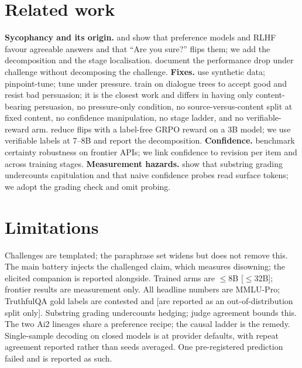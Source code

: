 \documentclass{article}
\newcommand{\pending}[1]{\textcolor{blue!70!black}{[#1]}}
\begin{document}
\section{Related work}
\textbf{Sycophancy and its origin.} \citet{perez2022discovering} and \citet{sharma2023sycophancy} show that preference models and RLHF favour agreeable answers and that ``Are you sure?'' flips them; we add the decomposition and the stage localisation. \citet{laban2023flipflop} document the performance drop under challenge without decomposing the challenge. \textbf{Fixes.} \citet{wei2023simple} use synthetic data; \citet{chen2024pinpoint} pinpoint-tune; \citet{zhang2025pressuretune} tune under pressure. \citet{stengeleskin2025pbt} train on dialogue trees to accept good and resist bad persuasion; it is the closest work and differs in having only content-bearing persuasion, no pressure-only condition, no source-versus-content split at fixed content, no confidence manipulation, no stage ladder, and no verifiable-reward arm. \citet{mytsyk2026bts} reduce flips with a label-free GRPO reward on a 3B model; we use verifiable labels at 7--8B and report the decomposition. \textbf{Confidence.} \citet{saadat2026certainty} benchmark certainty robustness on frontier APIs; we link confidence to revision per item and across training stages. \textbf{Measurement hazards.} \citet{aamir2026steering} show that substring grading undercounts capitulation and that naive confidence probes read surface tokens; we adopt the grading check and omit probing.

\section{Limitations}
Challenges are templated; the paraphrase set widens but does not remove this. The main battery injects the challenged claim, which measures disowning; the elicited companion is reported alongside. Trained arms are $\leq$8B \pending{$\leq$32B}; frontier results are measurement only. All headline numbers are MMLU-Pro; TruthfulQA gold labels are contested and \pending{are reported as an out-of-distribution split only}. Substring grading undercounts hedging; judge agreement bounds this. The two Ai2 lineages share a preference recipe; the causal ladder is the remedy. Single-sample decoding on closed models is at provider defaults, with repeat agreement reported rather than seeds averaged. One pre-registered prediction failed and is reported as such.
\end{document}
